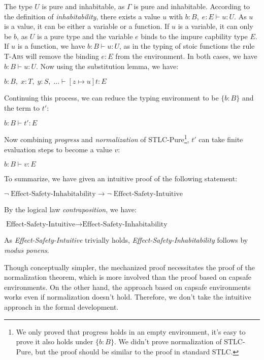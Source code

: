 The type $U$ is pure and inhabitable, as $\Gamma$ is pure and
inhabitable. According to the definition of \emph{inhabitability},
there exists a value $u$ with $b:B, \; e:E \vdash u: U$. As $u$ is a
value, it can be either a variable or a function. If $u$ is a
variable, it can only be $b$, as $U$ is a pure type and the variable
$e$ binds to the impure capbility type $E$. If $u$ is a function, we
have $b:B \vdash u: U$, as in the typing of stoic functions the rule
\textsc{T-Abs} will remove the binding $e:E$ from the environment. In
both cases, we have $b:B \vdash u: U$. Now using the substitution
lemma, we have:

\begin{center}
$b:B, \; x:T, \; y:S, \; \dots \vdash [z \mapsto u]t: E$
\end{center}

Continuing this process, we can reduce the typing environment to be
$\{b:B\}$ and the term to $t'$:

\begin{center}
$b:B \vdash t': E$
\end{center}

Now combining \emph{progress} and \emph{normalization} of
STLC-Pure\footnote{We only proved that progress holds in an empty
  environment, it's easy to prove it also holds under $\{b:B\}$. We
  didn't prove normalization of STLC-Pure, but the proof should be
  similar to the proof in standard STLC.}, $t'$ can take finite
evaluation steps to become a value $v$:

\begin{center}
$b:B \vdash v: E$
\end{center}

To summarize, we have given an intuitive proof of the following
statement:

\begin{center}
  $\neg \; \text{Effect-Safety-Inhabitability} \to \neg \;
  \text{Effect-Safety-Intuitive}$
\end{center}

By the logical law \emph{contraposition}, we have:

\begin{center}
  $ \text{Effect-Safety-Intuitive} \to
  \text{Effect-Safety-Inhabitability} $
\end{center}

As \emph{Effect-Safety-Intuitive} trivially holds,
\emph{Effect-Safety-Inhabitability} follows by \emph{modus ponens}.

Though conceptually simpler, the mechanized proof necessitates the
proof of the normalization theorem, which is more involved than the
proof based on capsafe environments. On the other hand, the approach
based on capsafe environments works even if normalization doesn't
hold. Therefore, we don't take the intuitive approach in the formal
development.

